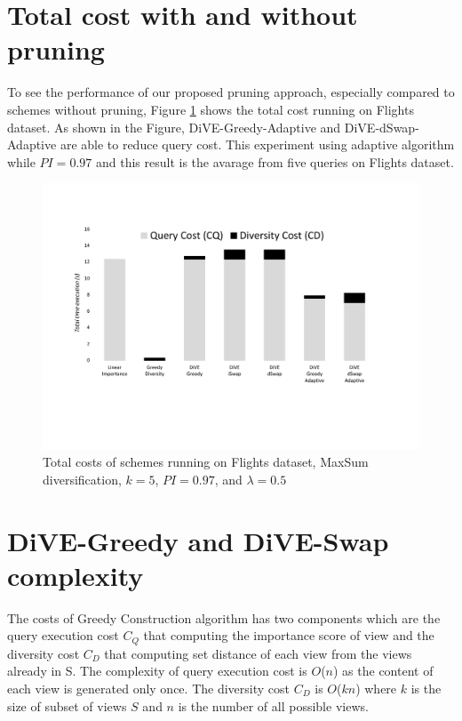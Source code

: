 \documentclass{article}
\begin{document}
\section{Total cost with and without pruning}
To see the performance of our proposed pruning approach, especially compared to schemes without pruning, Figure \ref{fig:flight_costs_all} shows the total cost running on Flights dataset. As shown in the Figure, DiVE-Greedy-Adaptive and DiVE-dSwap-Adaptive are able to reduce query cost. This experiment using adaptive algorithm while $ PI = 0.97 $ and this result is the avarage from five queries on Flights dataset. 


\begin{figure}
	\begin{center}
		\vspace{-50pt}
		\includegraphics[width=7.0in]{figures/flight_costs_all}
		\vspace{-90pt}
		\caption{Total costs of schemes running on Flights dataset, MaxSum diversification, $k = 5$,  $ PI = 0.97 $, and $\lambda = 0.5$ }
		\label{fig:flight_costs_all}
		\vspace{-20pt}
	\end{center}
\end{figure}

\section{DiVE-Greedy and DiVE-Swap complexity}
The costs of Greedy Construction algorithm has two components which are the query execution cost $C_Q$ that computing the importance score of view and the diversity cost $C_D$ that computing set distance of each view from the views already in S. The complexity of query execution cost is $ O$($n$) as the content of each view is generated only once. The diversity cost $C_D$ is $ O$($kn$) where $k$ is the size of subset of views $ S $ and $ n $ is the number of all possible views.
\end{document}
